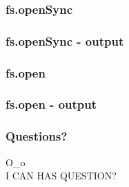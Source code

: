 \documentclass[16pt]{beamer}
\begin{document}
\begin{frame}[fragile]
  \frametitle{fs.openSync}
  \begin{footnotesize}
    
  \end{footnotesize}
\end{frame}

\begin{frame}[fragile]
  \frametitle{fs.openSync - output}
  \begin{scriptsize}
    
  \end{scriptsize}
\end{frame}

\begin{frame}[fragile]
  \frametitle{fs.open}
  \begin{footnotesize}
    
  \end{footnotesize}
\end{frame}

\begin{frame}[fragile]
  \frametitle{fs.open - output}
  \begin{scriptsize}
    
  \end{scriptsize}
\end{frame}

\begin{frame}
  \frametitle{Questions?}
  \begin{center}
    O\_o\\
    \vspace{1cm}
    I CAN HAS QUESTION?
  \end{center}
\end{frame}
\end{document}
